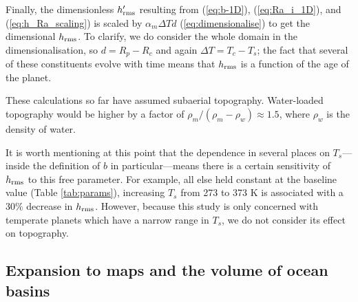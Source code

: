 Finally, the dimensionless $h_{\rm rms}^\prime$ resulting from (\ref{eq:b-1D}), (\ref{eq:Ra_i_1D}), and (\ref{eq:h_Ra_scaling}) is scaled by $\alpha_m \Delta T d$ (\ref{eq:dimensionalise}) to get the dimensional $h_{\rm rms}$. To clarify, we do consider the whole domain in the dimensionalisation, so $d = R_p - R_c$ and again $\Delta T = T_c - T_s$; the fact that several of these constituents evolve with time means that $h_{\rm rms}$ is a function of the age of the planet.

These calculations so far have assumed subaerial topography. Water-loaded topography would be higher by a factor of $\rho_m/(\rho_m - \rho_w) \approx 1.5$, where $\rho_w$ is the density of water.

It is worth mentioning at this point that the dependence in several places on $T_s$---inside the definition of $b$ in particular---means there is a certain sensitivity of $h_{\rm rms}$ to this free parameter. For example, all else held constant at the baseline value (Table \ref{tab:params}), increasing $T_s$ from 273 to 373 K is associated with a 30\% decrease in $h_{\rm rms}$. However, because this study is only concerned with temperate planets which have a narrow range in $T_s$, we do not consider its effect on topography.






\subsection{Expansion to maps and the volume of ocean basins}



